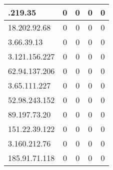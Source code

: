 \documentclass{article}
\begin{document}
\begin{longtable}{|>{\raggedright\arraybackslash}p{3cm}|c|c|c|c|}
    3.120.219.35 & 0 & 0 & 0 & 0 \\
    \hline
    
    
    \rowcolor{lightgreen} %
    
    18.202.92.68 & 0 & 0 & 0 & 0 \\
    \hline
    
    
    \rowcolor{lightgreen} %
    
    3.66.39.13 & 0 & 0 & 0 & 0 \\
    \hline
    
    
    \rowcolor{lightgreen} %
    
    3.121.156.227 & 0 & 0 & 0 & 0 \\
    \hline
    
    
    \rowcolor{lightgreen} %
    
    62.94.137.206 & 0 & 0 & 0 & 0 \\
    \hline
    
    
    \rowcolor{lightgreen} %
    
    3.65.111.227 & 0 & 0 & 0 & 0 \\
    \hline
    
    
    \rowcolor{lightgreen} %
    
    52.98.243.152 & 0 & 0 & 0 & 0 \\
    \hline
    
    
    \rowcolor{lightgreen} %
    
    89.197.73.20 & 0 & 0 & 0 & 0 \\
    \hline
    
    
    \rowcolor{lightgreen} %
    
    151.22.39.122 & 0 & 0 & 0 & 0 \\
    \hline
    
    
    \rowcolor{lightgreen} %
    
    3.160.212.76 & 0 & 0 & 0 & 0 \\
    \hline
    
    
    \rowcolor{lightgreen} %
    
    185.91.71.118 & 0 & 0 & 0 & 0 \\
    \hline
    

\end{longtable}
\end{document}
